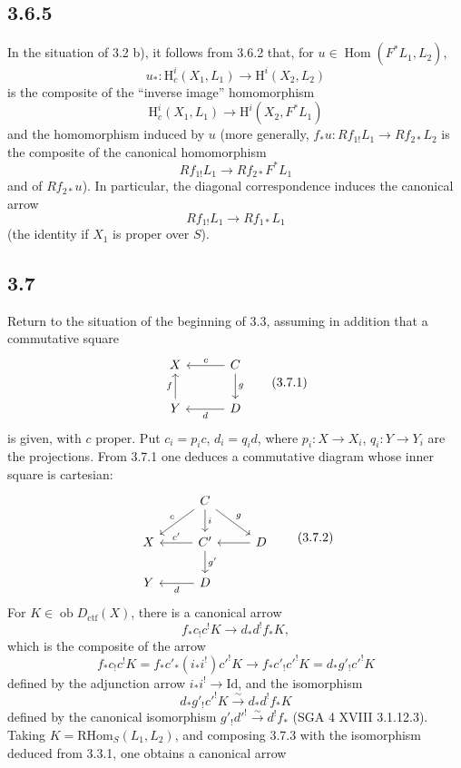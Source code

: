 \documentclass[11pt]{article}
\renewcommand{\H}{\mathrm{H}}
\DeclareMathOperator{\Hom}{Hom}
\newcommand{\ob}{\operatorname{ob}}
\providecommand{\RHom}{\mathrm{RHom}}
\providecommand{\Dctf}{D_{\mathrm{ctf}}}
\providecommand{\Id}{\mathrm{Id}}
\providecommand{\Dctf}{D_{\mathrm{ctf}}}
\providecommand{\RHom}{\mathrm{RHom}}
\providecommand{\Hom}{\operatorname{Hom}}
\providecommand{\ob}{\operatorname{ob}}
\providecommand{\RHom}{\mathrm R\mathcal{H}om}
\providecommand{\RHom}{\mathrm{RHom}}
\begin{document}
\subsection*{3.6.5}
In the situation of 3.2 b), it follows from 3.6.2 that, for $u\in\Hom(F^*L_1,L_2)$,
\[
u_*:\H_c^i(X_1,L_1)\longrightarrow \H^i(X_2,L_2)
\]
is the composite of the ``inverse image'' homomorphism
\[
\H_c^i(X_1,L_1)\longrightarrow \H^i(X_2,F^*L_1)
\]
and the homomorphism induced by $u$ (more generally, $f_*u:Rf_{1!}L_1\to Rf_{2*}L_2$ is the composite of the canonical homomorphism
\[
Rf_{1!}L_1\longrightarrow Rf_{2*}F^*L_1
\]
and of $Rf_{2*}u$). In particular, the diagonal correspondence induces the canonical arrow
\[
Rf_{1!}L_1\longrightarrow Rf_{1*}L_1
\]
(the identity if $X_1$ is proper over $S$).

\subsection*{3.7}
Return to the situation of the beginning of 3.3, assuming in addition that a commutative square
\begin{equation}
\begin{tikzcd}[column sep=3em,row sep=2em]
X & C \arrow[l,"c"'] \arrow[d,"g"] \\
Y \arrow[u,"f"] & D \arrow[l,"d"]
\end{tikzcd}
\tag{3.7.1}
\end{equation}
is given, with $c$ proper. Put $c_i=p_ic$, $d_i=q_id$, where $p_i:X\to X_i$, $q_i:Y\to Y_i$ are the projections. From 3.7.1 one deduces a commutative diagram whose inner square is cartesian:
\begin{equation}
\begin{tikzcd}[column sep=2.6em,row sep=1.8em]
& C \arrow[dl,"c"'] \arrow[d,"i"] \arrow[dr,"g"] & \\
X & C' \arrow[l,"c'"'] \arrow[d,"g'"] & D \arrow[l] \\
Y & D \arrow[l,"d"] &
\end{tikzcd}
\tag{3.7.2}
\end{equation}
For $K\in\ob\Dctf(X)$, there is a canonical arrow
\begin{equation}
f_*c_!c^!K\longrightarrow d_*d^!f_*K,
\tag{3.7.3}
\end{equation}
which is the composite of the arrow
\[
f_*c_!c^!K=f_*c'_*(i_*i^!)c'^!K\longrightarrow f_*c'_!c'^!K=d_*g'_!c'^!K
\]
defined by the adjunction arrow $i_*i^!\to\Id$, and the isomorphism
\[
d_*g'_!c'^!K\xrightarrow{\sim}d_*d^!f_*K
\]
defined by the canonical isomorphism $g'_!d'^!\xrightarrow{\sim}d^!f_*$ (SGA 4 XVIII 3.1.12.3). Taking $K=\RHom_S(L_1,L_2)$, and composing 3.7.3 with the isomorphism deduced from 3.3.1, one obtains a canonical arrow
\end{document}
